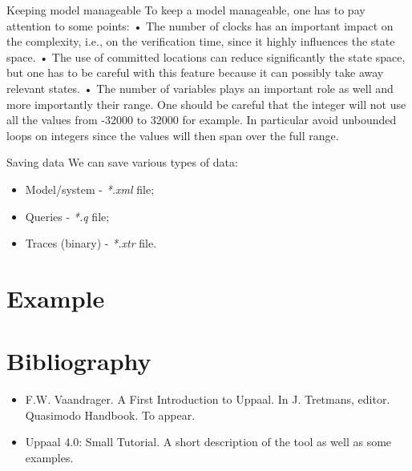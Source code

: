 \documentclass{beamer}
\begin{document}
\begin{frame}{Keeping model manageable}
	To keep a model manageable, one has to pay attention to some points:
	• The number of clocks has an important impact on the complexity, i.e., on the verification
	time, since it highly influences the state space.
	• The use of committed locations can reduce significantly the state space, but one has to be
	careful with this feature because it can possibly take away relevant states.
	• The number of variables plays an important role as well and more importantly their range.
	One should be careful that the integer will not use all the values from -32000 to 32000 for
	example. In particular avoid unbounded loops on integers since the values will then span
	over the full range.
\end{frame}

\begin{frame}{Saving data}
	We can save various types of data:
	
	\begin{itemize}
		\item Model/system - \textit{*.xml} file;
		\item Queries - \textit{*.q} file;
		\item Traces (binary) - \textit{*.xtr} file.
	\end{itemize}
\end{frame}

\section{Example}

\section{Bibliography}

\begin{frame}
	\begin{itemize}
		\item F.W. Vaandrager. A First Introduction to Uppaal. In J. Tretmans, editor. Quasimodo Handbook. To appear.
		\item Uppaal 4.0: Small Tutorial. A short description of the tool as well as some examples.
	\end{itemize}
\end{frame}
\end{document}
